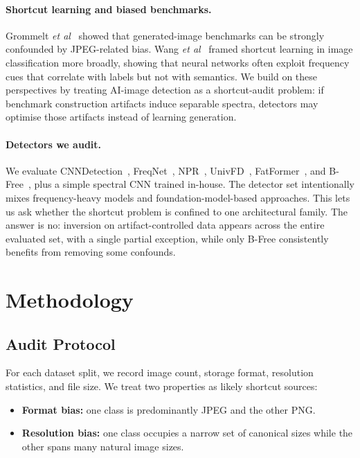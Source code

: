 \documentclass{bmvc2k}
\def\etal{\emph{et al}\bmvaOneDot}
\begin{document}
\paragraph{Shortcut learning and biased benchmarks.}
Grommelt \etal~\cite{grommelt2024} showed that generated-image benchmarks can be strongly confounded by JPEG-related bias. Wang \etal~\cite{wang2023frequency} framed shortcut learning in image classification more broadly, showing that neural networks often exploit frequency cues that correlate with labels but not with semantics. We build on these perspectives by treating AI-image detection as a shortcut-audit problem: if benchmark construction artifacts induce separable spectra, detectors may optimise those artifacts instead of learning generation.

\paragraph{Detectors we audit.}
We evaluate CNNDetection~\cite{wang2020cnn}, FreqNet~\cite{freqnet}, NPR~\cite{npr}, UnivFD~\cite{univfd}, FatFormer~\cite{fatformer}, and B-Free~\cite{bfree}, plus a simple spectral CNN trained in-house. The detector set intentionally mixes frequency-heavy models and foundation-model-based approaches. This lets us ask whether the shortcut problem is confined to one architectural family. The answer is no: inversion on artifact-controlled data appears across the entire evaluated set, with a single partial exception, while only B-Free consistently benefits from removing some confounds.

\section{Methodology}
\label{sec:method}

\subsection{Audit Protocol}
\label{sec:audit_method}

For each dataset split, we record image count, storage format, resolution statistics, and file size. We treat two properties as likely shortcut sources:
\begin{itemize}
  \item \textbf{Format bias:} one class is predominantly JPEG and the other PNG.
  \item \textbf{Resolution bias:} one class occupies a narrow set of canonical sizes while the other spans many natural image sizes.
\end{itemize}
\end{document}
